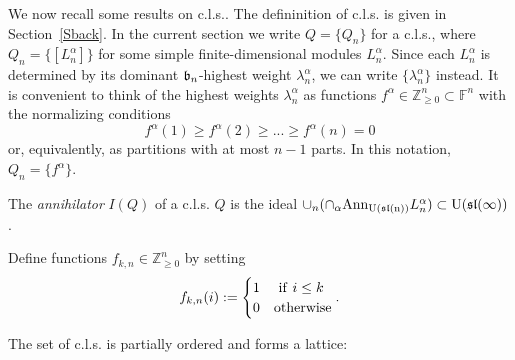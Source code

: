 \documentclass[10pt]{amsart}\oddsidemargin -1mm \evensidemargin -1mm \topmargin -15mm\headheight5mm \headsep 3.5mm \textheight 245mm\textwidth 170mm
\theoremstyle{definition}\newtheorem{theorem}{Theorem}[section]\newtheorem{lemma}[theorem]{Lemma}\newtheorem{remark}[theorem]{Remark}\newtheorem{proposition}[theorem]{Proposition}\newtheorem{corollary}[theorem]{Corollary}\newtheorem{definition}[theorem]{Definition}\newtheorem{Ex}[theorem]{Example}\newtheorem{obs}[theorem]{Observation}\newtheorem{nota}[theorem]{Notation}
\begin{document}
We now recall some results on c.l.s.. 
The defininition of c.l.s. is given in Section~\ref{Sback}. 
In the current section we write $Q=\{Q_n\}$ for a c.l.s., where $Q_n=\{[L_n^\alpha]\}$ for some simple finite-dimensional modules $L_n^\alpha$. 
Since each $L_n^\alpha$ is determined by its dominant $\frak b_n$-highest weight $\lambda_n^\alpha$, we can write $\{\lambda_n^\alpha\}$ instead. 
It is convenient to think of the highest weights $\lambda_n^\alpha$ as functions $f^\alpha\in\mathbb Z_{\ge0}^n\subset\mathbb F^n$ with the normalizing conditions
$$f^\alpha(1)\ge f^\alpha(2)\ge...\ge f^\alpha(n)=0$$
or, equivalently, as partitions with at most $n-1$ parts.  
In this notation, $Q_n=\{f^\alpha\}$. 

The {\it annihilator} $I(Q)$ of a c.l.s. $Q$ is the ideal $\cup_n(\cap_\alpha{\rm Ann}_{{\rm U(\frak{sl}(n))}}L_n^\alpha)\subset{\rm U}(\frak{sl}(\infty))$.

Define functions $f_{k, n}\in\mathbb Z_{\ge0}^n$ by setting
$$f_{k, n}(i):=\begin{cases}1&{\rm~if~}i\le k\\0&{\rm otherwise}\end{cases}.$$

The set of c.l.s. is partially ordered and forms a lattice:
\end{document}
